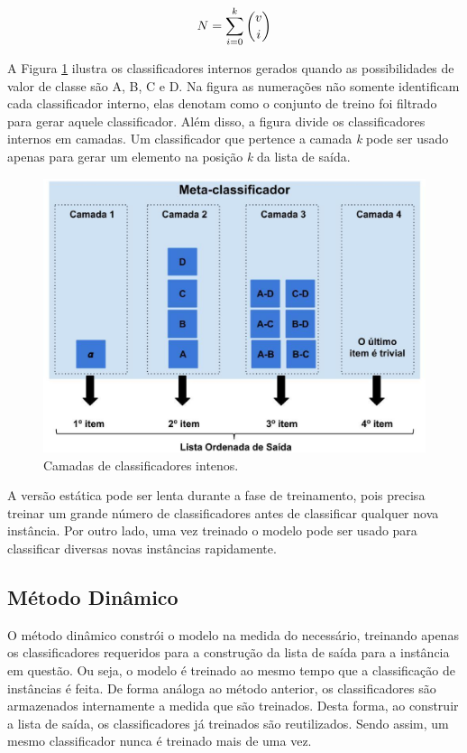 \begin{equation*}

\centering
\textit{N} = \sum\limits_{i=0}^k \binom{v}{i}

\end{equation*}

A Figura \ref{fig:metodoproposto03} ilustra os classificadores internos gerados quando as possibilidades de valor de classe são A, B, C e D. Na figura as numerações não somente identificam cada classificador interno, elas denotam como o conjunto de treino foi filtrado para gerar aquele classificador. Além disso, a figura divide os classificadores internos em camadas. Um classificador que pertence a camada \textit{k} pode ser usado apenas para gerar um elemento na posição \textit{k} da lista de saída.

\begin{figure}[h!]
  \includegraphics[width=\linewidth]{images/metodoproposto03.eps}
  \caption{Camadas de classificadores intenos.}
  \label{fig:metodoproposto03}
\end{figure}

A versão estática pode ser lenta durante a fase de treinamento, pois precisa treinar um grande número de classificadores antes de classificar qualquer nova instância. Por outro lado, uma vez treinado o modelo pode ser usado para classificar diversas novas instâncias rapidamente.

\subsection{Método Dinâmico}

O método dinâmico constrói o modelo na medida do necessário, treinando apenas os classificadores requeridos para a construção da lista de saída para a instância em questão. Ou seja, o modelo é treinado ao mesmo tempo que a classificação de instâncias é feita. De forma análoga ao método anterior, os classificadores são armazenados internamente a medida que são treinados. Desta forma, ao construir a lista de saída, os classificadores já treinados são reutilizados. Sendo assim, um mesmo classificador nunca é treinado mais de uma vez. 

